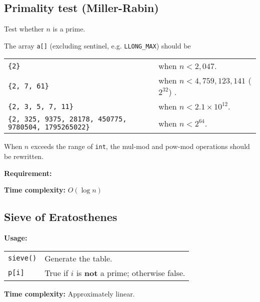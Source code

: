 \subsection{Primality test (Miller-Rabin)}
Test whether $n$ is a prime. \par
The array \lstinline|a[]| (excluding sentinel, e.g. \lstinline|LLONG_MAX|) should be \\
\begin{tabular}{p{6cm} p{5cm}}
  \lstinline|{2}| & when $n < 2,047$. \\
  \lstinline|{2, 7, 61}| & when $n < 4,759,123,141$ ($2^{32}$) . \\
  \lstinline|{2, 3, 5, 7, 11}| & when $n < 2.1 \times 10^{12}$. \\
  \lstinline|{2, 325, 9375, 28178, 450775, 9780504, 1795265022}| & when $n < 2^{64}$.
\end{tabular} \par
\Warning When $n$ exceeds the range of \lstinline|int|, the mul-mod and pow-mod operations should be rewritten. \par
\textbf{Requirement:} \\
 \par
\textbf{Time complexity:} $O(\log n)$ \par


\subsection{Sieve of Eratosthenes}
\textbf{Usage:} \\[0.1cm]
\begin{tabular}{p{3cm} p{8cm}}
  \lstinline|sieve()| & Generate the table. \\
  \lstinline|p[i]| & True if $i$ is \textbf{not} a prime; otherwise false.
\end{tabular} \par
\textbf{Time complexity:} Approximately linear. \par


